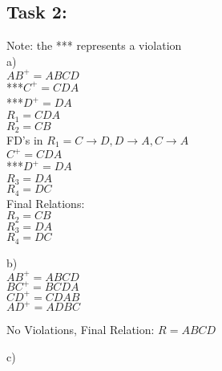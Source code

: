 \documentclass[12pt] {article}
\begin{document}
        \subsection*{Task 2:}
        \begin{flushleft}
        Note: the *** represents a violation\\
        a)\\
        $AB^{+} = {ABCD}$\\
        ***$C^{+} = {CDA}$\\
        ***$D^{+} = {DA}$\\
        $R_{1} = CDA$\\
        $R_{2} = CB$\\
        \medskip
        FD's in $R_{1} = C \rightarrow D, D \rightarrow A, C \rightarrow A $\\
        $C^{+} = CDA$\\
        ***$D^{+} = DA$\\
        $R_{3} = DA$\\
        $R_{4} = DC$\\
        Final Relations:\\
        $R_{2} = CB$\\
        $R_{3} = DA$\\
        $R_{4} = DC$
        \end{flushleft}
        \begin{flushleft}
        b)\\
        $AB^{+} = ABCD$\\
        $BC^{+} = BCDA$\\
        $CD^{+} = CDAB$\\
        $AD^{+} = ADBC$

        No Violations, Final Relation:
        $R = ABCD$
       	\end{flushleft}
       	\begin{flushleft}
       	c)\\
       	\end{flushleft}
\end{document}
